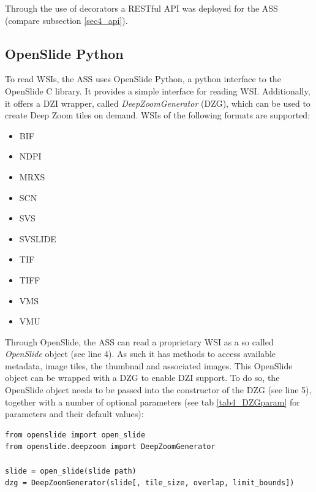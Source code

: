 Through the use of decorators a RESTful API was deployed for the ASS (compare subsection \ref{sec4_api}).


\subsection{OpenSlide Python}
\label{sec4_openslide}
To read WSIs, the ASS uses OpenSlide Python, a python interface to the OpenSlide C library. It provides a simple interface for reading WSI. Additionally, it offers a DZI wrapper\cite{web:openslide}, called \emph{DeepZoomGenerator} (DZG), which can be used to create Deep Zoom tiles on demand. WSIs of the following formats are supported:

\begin{itemize}
	\item BIF
	\item NDPI
	\item MRXS
	\item SCN
	\item SVS
	\item SVSLIDE
	\item TIF
	\item TIFF
	\item VMS
	\item VMU
\end{itemize}

Through OpenSlide, the ASS can read a proprietary WSI as a so called \emph{OpenSlide} object (see line 4). As such it has methods to access available metadata, image tiles, the thumbnail and associated images. This OpenSlide object can be wrapped with a DZG to enable DZI support\cite{web:openslide}. To do so, the OpenSlide object needs to be passed into the constructor of the DZG (see line 5), together with a number of optional parameters (see tab \ref{tab4_DZGparam} for parameters and their default values):

\begin{lstlisting}[frame=single]
from openslide import open_slide
from openslide.deepzoom import DeepZoomGenerator

slide = open_slide(slide path)
dzg = DeepZoomGenerator(slide[, tile_size, overlap, limit_bounds])
\end{lstlisting}

